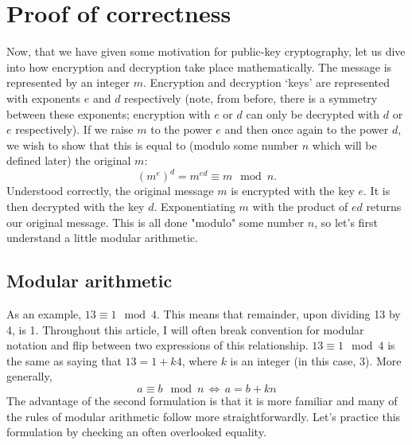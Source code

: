 \documentclass[]{scrartcl}
\theoremstyle{definition}
\begin{document}
\section{Proof of correctness}\label{sec:poc}
Now, that we have given some motivation for public-key cryptography, let us dive into how encryption and decryption take place mathematically. The message is represented by an integer $m$. Encryption and decryption `keys' are represented with exponents $e$ and $d$ respectively (note, from before, there is a symmetry between these exponents; encryption with $e$ or $d$ can only be decrypted with $d$ or $e$ respectively). If we raise $m$ to the power $e$ and then once again to the power $d$, we wish to show that this is equal to (modulo some number $n$ which will be defined later) the original $m$: 
\begin{equation}\label{eqn:statement}
    (m^e)^d = m^{ed} \equiv m \mod n.
\end{equation}
Understood correctly, the original message $m$ is encrypted with the key $e$. It is then decrypted with the key $d$. Exponentiating $m$ with the product of $ed$ returns our original message. This is all done "modulo" some number $n$, so let's first understand a little modular arithmetic.
\subsection{Modular arithmetic}\label{sec:mod-ari}
As an example, $13 \equiv 1 \mod 4$. This means that remainder, upon dividing 13 by 4, is 1. Throughout this article, I will often break convention for modular notation and flip between two expressions of this relationship. $13 \equiv 1 \mod 4$ is the same as saying that $13 = 1 + k4$, where $k$ is an integer (in this case, 3). More generally,
\begin{equation}
    a \equiv b \mod n \, \Leftrightarrow \, a = b + kn
\end{equation}
The advantage of the second formulation is that it is more familiar and many of the rules of modular arithmetic follow more straightforwardly. Let's practice this formulation by checking an often overlooked equality.
\end{document}

